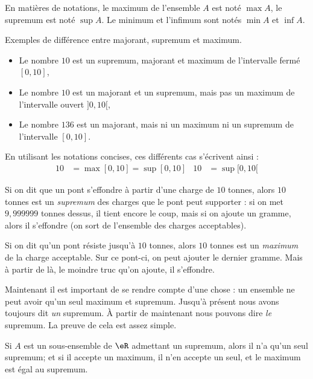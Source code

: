 En matières de notations, le maximum de l'ensemble $A$ est noté $\max A$, le supremum est noté $\sup A$. Le minimum et l'infimum sont notés $\min A$ et $\inf A$.

\begin{example}
Exemples de différence entre majorant, supremum et maximum.
\begin{itemize}
\item Le nombre $10$ est un supremum, majorant et maximum de l'intervalle fermé $[0,10]$,
\item Le nombre $10$ est un majorant et un supremum, mais pas un maximum de l'intervalle ouvert $]0,10[$,
\item Le nombre $136$ est un majorant, mais ni un maximum ni un supremum de l'intervalle $[0,10]$.
\end{itemize}
\end{example}

En utilisant les notations concises, ces différents cas s'écrivent ainsi :
\begin{align*}
10&=\max[0,10]=\sup[0,10]	& 10&=\sup[0,10[
\end{align*}


\begin{example}
Si on dit que un pont s'effondre à partir d'une charge de $10$ tonnes, alors $10$ tonnes est un \emph{supremum} des charges que le pont peut supporter : si on met $9,999999$ tonnes dessus, il tient encore le coup, mais si on ajoute un gramme, alors il s'effondre (on sort de l'ensemble des charges acceptables).
\end{example}

\begin{example}
Si on dit qu'un pont résiste jusqu'à $10$ tonnes, alors $10$ tonnes est un \emph{maximum} de la charge acceptable. Sur ce pont-ci, on peut ajouter le dernier gramme. Mais à partir de là, le moindre truc qu'on ajoute, il s'effondre.
\end{example}

Maintenant il est important de se rendre compte d'une chose : un ensemble ne peut avoir qu'un seul maximum et supremum. Jusqu'à présent nous avons toujours dit \emph{un} supremum. À partir de maintenant nous pouvons dire \emph{le} supremum. La preuve de cela est assez simple.
\begin{proposition}
Si $A$ est un sous-ensemble de $\eR$ admettant un supremum, alors il n'a qu'un seul supremum; et si il accepte un maximum, il n'en accepte un seul, et le maximum est égal au supremum.
\end{proposition}

